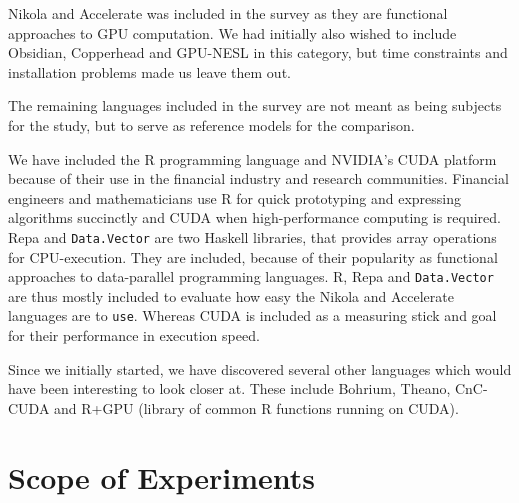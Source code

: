 Nikola and Accelerate was included in the survey as they are
functional approaches to GPU computation. We had initially also wished
to include Obsidian\cite{svensson2011obsidian},
Copperhead\cite{Catanzaro2011} and GPU-NESL\cite{bergstrom2012nested}
in this category, but time constraints and installation problems made
us leave them out.

The remaining languages included in the survey are not meant as being
subjects for the study, but to serve as reference models for the
comparison.

We have included the R programming language and NVIDIA's CUDA platform
because of their use in the financial industry and research
communities. Financial engineers and mathematicians use R for quick
prototyping and expressing algorithms succinctly and CUDA when
high-performance computing is required. Repa and \texttt{Data.Vector}
are two Haskell libraries, that provides array operations for
CPU-execution. They are included, because of their popularity as
functional approaches to data-parallel programming languages. R, Repa
and \texttt{Data.Vector} are thus mostly included to evaluate how easy
the Nikola and Accelerate languages are to \texttt{use}. Whereas CUDA
is included as a measuring stick and goal for their performance in
execution speed.

Since we initially started, we have discovered several other languages
which would have been interesting to look closer at. These include
Bohrium\cite{homepage:bohrium}, Theano\cite{bergstra2010theano},
CnC-CUDA\cite{grossman2011cnc} and R+GPU\cite{homepage:rgpu} (library
of common R functions running on CUDA).

\section{Scope of Experiments} %
%
%


